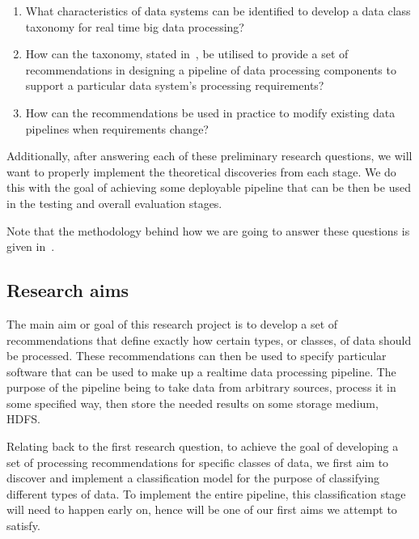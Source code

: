 \documentclass[a4paper,11pt]{article}
\begin{document}
\begin{enumerate}
  \item\label{item:taxonomy} What characteristics of data systems can be identified to develop a data class taxonomy
  for real time big data processing?
  \item\label{item:recommendations} How can the taxonomy, stated in~, be utilised to provide a set
  of recommendations in designing a pipeline of data processing components to support a particular data system's
  processing requirements?
  \item\label{item:pipeline} How can the recommendations be used in practice to modify existing data pipelines when
  requirements change?
\end{enumerate}

Additionally, after answering each of these preliminary research questions, we will want to properly implement the
theoretical discoveries from each stage. We do this with the goal of achieving some deployable pipeline that can be then
be used in the testing and overall evaluation stages.

Note that the methodology behind how we are going to answer these questions is given in~.



\subsection{Research aims} %
\label{sub:research_aims}

The main aim or goal of this research project is to develop a set of recommendations that define exactly how certain
types, or classes, of data should be processed. These recommendations can then be used to specify particular software
that can be used to make up a realtime data processing pipeline. The purpose of the pipeline being to take data from
arbitrary sources, process it in some specified way, then store the needed results on some storage medium, \eg HDFS.

Relating back to the first research question, to achieve the goal of developing a set of processing recommendations for
specific classes of data, we first aim to discover and implement a classification model for the purpose of
classifying different types of data. To implement the entire pipeline, this classification stage will need to happen early
on, hence will be one of our first aims we attempt to satisfy.
\end{document}
